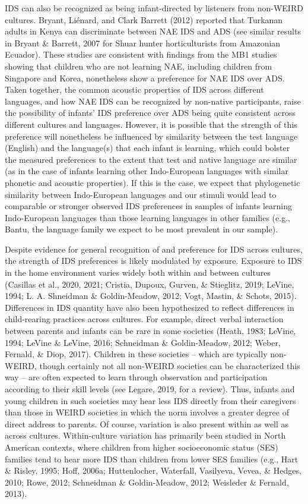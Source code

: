 \documentclass[
  ,man,floatsintext]{apa6}
\begin{document}
IDS can also be recognized as being infant-directed by listeners from non-WEIRD cultures. Bryant, Liénard, and Clark Barrett (2012) reported that Turkanan adults in Kenya can discriminate between NAE IDS and ADS (see similar results in Bryant \& Barrett, 2007 for Shuar hunter horticulturists from Amazonian Ecuador). These studies are consistent with findings from the MB1 studies showing that children who are not learning NAE, including children from Singapore and Korea, nonetheless show a preference for NAE IDS over ADS. Taken together, the common acoustic properties of IDS across different languages, and how NAE IDS can be recognized by non-native participants, raise the possibility of infants' IDS preference over ADS being quite consistent across different cultures and languages. However, it is possible that the strength of this preference will nonetheless be influenced by similarity between the test language (English) and the language(s) that each infant is learning, which could bolster the measured preferences to the extent that test and native language are similar (as in the case of infants learning other Indo-European languages with similar phonetic and acoustic properties). If this is the case, we expect that phylogenetic similarity between Indo-European languages and our stimuli would lead to comparable or stronger observed IDS preferences in samples of infants learning Indo-European languages than those learning languages in other families (e.g., Bantu, the language family we expect to be most prevalent in our sample).

Despite evidence for general recognition of and preference for IDS across cultures, the strength of IDS preferences is likely modulated by exposure. Exposure to IDS in the home environment varies widely both within and between cultures (Casillas et al., 2020, 2021; Cristia, Dupoux, Gurven, \& Stieglitz, 2019; LeVine, 1994; L. A. Shneidman \& Goldin-Meadow, 2012; Vogt, Mastin, \& Schots, 2015). Differences in IDS quantity have also been hypothesized to reflect differences in child-rearing practices across cultures. For example, direct verbal interaction between parents and infants can be rare in some societies (Heath, 1983; LeVine, 1994; LeVine \& LeVine, 2016; Schneidman \& Goldin-Meadow, 2012; Weber, Fernald, \& Diop, 2017). Children in these societies -- which are typically non-WEIRD, though certainly not all non-WEIRD societies can be characterized this way -- are often expected to learn through observation and participation according to their skill levels (see Legare, 2019, for a review). Thus, infants and young children in such societies may hear less IDS directly from their caregivers than those in WEIRD societies in which the norm involves a greater degree of direct address to parents. Of course, variation is also present within as well as across cultures. Within-culture variation has primarily been studied in North American contexts, where children from higher socioeconomic status (SES) families tend to hear more IDS than children from lower SES families (e.g., Hart \& Risley, 1995; Hoff, 2006a; Huttenlocher, Waterfall, Vasilyeva, Vevea, \& Hedges, 2010; Rowe, 2012; Schneidman \& Goldin-Meadow, 2012; Weisleder \& Fernald, 2013).
\end{document}
